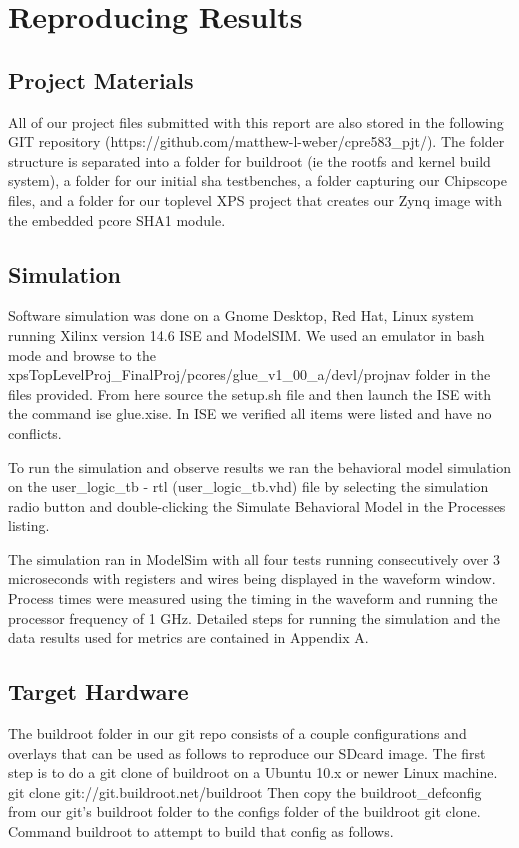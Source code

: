 \documentclass[journal]{IEEEtran}
\begin{document}
\section{Reproducing Results}
\subsection{Project Materials}
All of our project files submitted with this report are also stored in the following GIT repository (https://github.com/matthew-l-weber/cpre583\_pjt/).  The folder structure is separated into a folder for buildroot (ie the rootfs and kernel build system), a folder for our initial sha testbenches, a folder capturing our Chipscope files, and a folder for our toplevel XPS project that creates our Zynq image with the embedded pcore SHA1 module. 
\subsection{Simulation}
Software simulation was done on a Gnome Desktop, Red Hat, Linux system running Xilinx version 14.6 ISE and ModelSIM.  We used an emulator in bash mode and browse to the xpsTopLevelProj\_FinalProj/pcores/glue\_v1\_00\_a/devl/projnav folder in the files provided.  From here source the setup.sh file and then launch the ISE with the command ise glue.xise.  In ISE we verified all items were listed and have no conflicts.

To run the simulation and observe results we ran the behavioral model simulation on the  user\_logic\_tb - rtl (user\_logic\_tb.vhd) file by selecting the simulation radio button and double-clicking the Simulate Behavioral Model in the Processes listing.

The simulation ran in ModelSim with all four tests running consecutively over 3 microseconds with registers and wires being displayed in the waveform window.  Process times were measured using the timing in the waveform and running the processor frequency of 1 GHz. Detailed steps for running the simulation and the data results used for metrics are contained in Appendix A.

\subsection{Target Hardware}
The buildroot folder in our git repo consists of a couple configurations and overlays that can be used as follows to reproduce our SDcard image.  The first step is to do a git clone of buildroot on a Ubuntu 10.x or newer Linux machine.
	git clone git://git.buildroot.net/buildroot
Then copy the buildroot\_defconfig from our git's buildroot folder to the configs folder of the buildroot git clone.  Command buildroot to attempt to build that config as follows.
\end{document}
